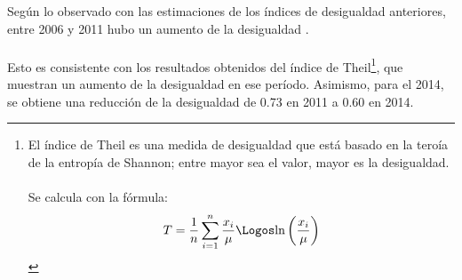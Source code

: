   Según lo observado con las estimaciones de los índices de desigualdad anteriores, entre 2006 y 2011 hubo  un aumento de la desigualdad .\\ \\ 
 Esto es consistente con los resultados obtenidos del índice de Theil\footnote{El índice de Theil es una medida de desigualdad que está basado en la teroía de la entropía de Shannon; entre mayor sea el valor, mayor es la desigualdad. \\\\ Se calcula con la fórmula: \[ T =\frac{1}{n} \sum_{i=1}^{n}\frac{x_i}{\mu}\Logos\mbox{ln} \left(\frac{x_i}{\mu}\right) \]}, que muestran un aumento de la desigualdad en ese período. Asimismo, para el 2014, se obtiene una reducción de la desigualdad de 0.73 en 2011 a 0.60 en 2014.